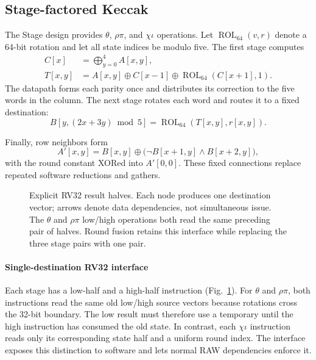 \documentclass[conference,letterpaper]{IEEEtran}
\newcommand{\rot}{\operatorname{ROL}_{64}}
\begin{document}
\subsection{Stage-factored Keccak}
The Stage design provides $\theta$, $\rho\pi$, and $\chi\iota$ operations.
Let $\rot(v,r)$ denote a 64-bit rotation and let all state indices be modulo
five. The first stage computes
\begin{align}
 C[x] &= \bigoplus_{y=0}^{4} A[x,y],\\
 T[x,y] &= A[x,y]\oplus C[x-1]\oplus\rot(C[x+1],1).
\end{align}
The datapath forms each parity once and distributes its correction to the
five words in the column. The next stage rotates each word and routes it
to a fixed destination:
\begin{equation}
 B[y,(2x+3y)\bmod5]=\rot(T[x,y],r[x,y]).
\end{equation}
\begin{samepage}
Finally, row neighbors form
\begin{equation}
 A'[x,y]=B[x,y]\oplus\bigl(\neg B[x+1,y]\land B[x+2,y]\bigr),
\end{equation}
with the round constant XORed into $A'[0,0]$.
These fixed connections replace repeated software reductions and gathers.
\end{samepage}

\begin{figure}[t]
\centering
\caption{Explicit RV32 result halves. Each node produces one destination
vector; arrows denote data dependencies, not simultaneous issue.
The $\theta$ and $\rho\pi$ low/high operations both read the same preceding
pair of halves. Round fusion retains this interface while replacing the
three stage pairs with one pair.}
\label{fig:halves}
\end{figure}

\paragraph{Single-destination RV32 interface}
Each stage has a low-half and a high-half instruction
(Fig.~\ref{fig:halves}). For $\theta$ and $\rho\pi$, both instructions read
the same old low/high source vectors because rotations cross the 32-bit
boundary. The low result must therefore use a temporary until the high
instruction has consumed the old state. In contrast, each $\chi\iota$
instruction reads only its corresponding state half and a uniform round
index. The interface exposes this distinction to software and lets normal
RAW dependencies enforce it.
\end{document}
